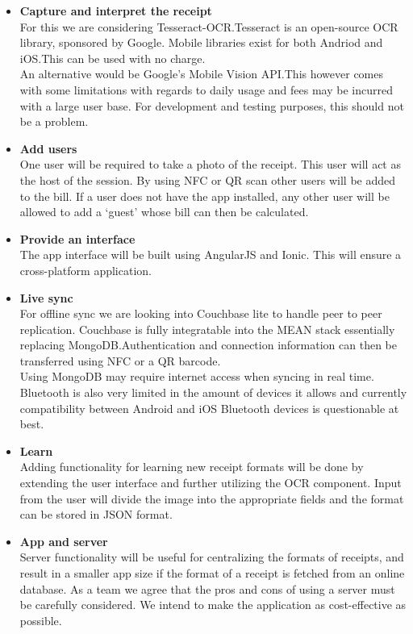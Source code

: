 \documentclass[12pt,a4paper]{article}
\begin{document}
   \begin{itemize}
      \item \textbf{Capture and interpret the receipt}\\
         For this we are considering Tesseract-OCR.\@ Tesseract is an open-source OCR library, sponsored by Google. Mobile libraries exist for both Andriod and iOS.\@ This can be used with no charge.\\
         An alternative would be Google's Mobile Vision API.\@ This however comes with some limitations with regards to daily usage and fees may be incurred with a large user base. For development and testing purposes, this
         should not be a problem.
      \item \textbf{Add users}\\
         One user will be required to take a photo of the receipt. This user will act as the host of the session. By using NFC or QR scan other users will be added to the bill. If a user does not have the app installed, any
         other user will be allowed to add a `guest' whose bill can then be calculated.
      \item \textbf{Provide an interface}\\
         The app interface will be built using AngularJS and Ionic. This will ensure a cross-platform application.
      \item \textbf{Live sync}\\
         For offline sync we are looking into Couchbase lite to handle peer to peer replication. Couchbase is fully integratable into the MEAN stack essentially replacing MongoDB.\@ Authentication and connection information can
         then be transferred using NFC or a QR barcode.\\
         Using MongoDB may require internet access when syncing in real time.\\
         Bluetooth is also very limited in the amount of devices it allows and currently compatibility between Android and iOS Bluetooth devices is questionable at best.
      \item \textbf{Learn}\\
         Adding functionality for learning new receipt formats will be done by extending the user interface and further utilizing the OCR component. Input from the user will divide the image into the appropriate fields and the
         format can be stored in JSON format.
      \item \textbf{App and server}\\
         Server functionality will be useful for centralizing the formats of receipts, and result in a smaller app size if the format of a receipt is fetched from an online database. As a team we agree that the pros and cons of
         using a server must be carefully considered. We intend to make the application as cost-effective as possible.
   \end{itemize}
\end{document}

